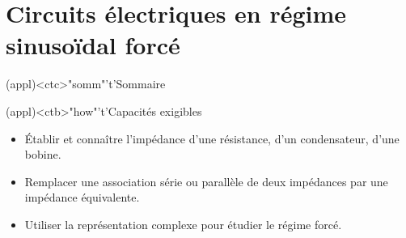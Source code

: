 \documentclass[../../main/main.tex]{subfiles}
\begin{document}
\setcounter{chapter}{5}


\chapter{Circuits électriques en régime sinusoïdal forcé}

\vspace*{\fill}

\begin{tcn}(appl)<ctc>"somm"'t'{Sommaire}
	\let\item\olditem
	\vspace{-15pt}
	\minitoc
	\vspace{-25pt}
\end{tcn}

\begin{tcn}[sidebyside](appl)<ctb>"how"'t'{Capacités exigibles}
	\begin{itemize}[label=\rcheck]
		\item Établir et connaître l'impédance d'une résistance, d'un condensateur,
		      d'une bobine.
	\end{itemize}
	\tcblower
	\begin{itemize}[label=\rcheck]
		\item Remplacer une association série ou parallèle de deux impédances par
		      une impédance équivalente.
		\item Utiliser la représentation complexe pour étudier le régime forcé.
	\end{itemize}
\end{tcn}

\vspace*{\fill}
\newpage
\vspace*{\fill}
\end{document}

